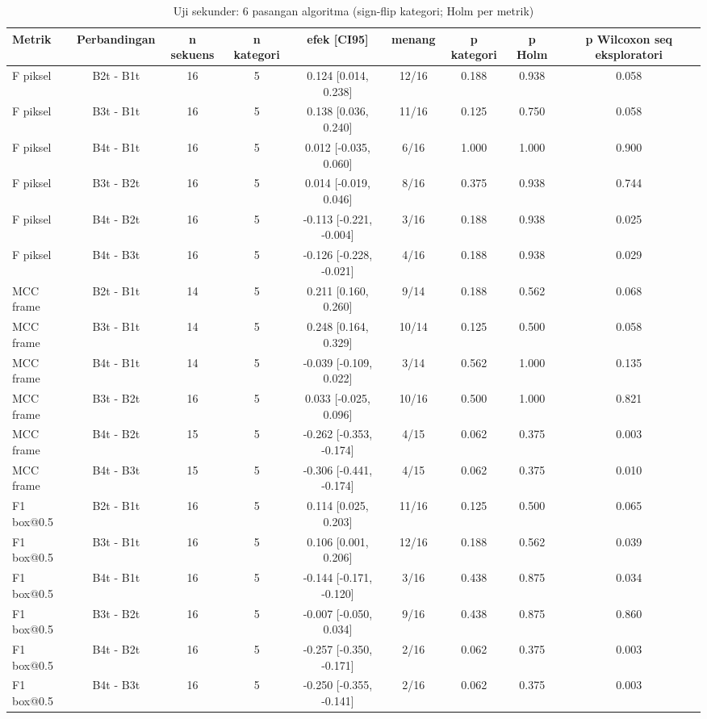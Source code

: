 \begin{table}[t]
\centering
\caption{Uji sekunder: 6 pasangan algoritma (sign-flip kategori; Holm per metrik)}
\label{tab:stats_secondary}
\begin{tabular}{lcccccccc}
\toprule
Metrik & Perbandingan & n sekuens & n kategori & efek [CI95] & menang & p kategori & p Holm & p Wilcoxon seq eksploratori \\
\midrule
F piksel & B2t - B1t & 16 & 5 & 0.124 [0.014, 0.238] & 12/16 & 0.188 & 0.938 & 0.058 \\
F piksel & B3t - B1t & 16 & 5 & 0.138 [0.036, 0.240] & 11/16 & 0.125 & 0.750 & 0.058 \\
F piksel & B4t - B1t & 16 & 5 & 0.012 [-0.035, 0.060] & 6/16 & 1.000 & 1.000 & 0.900 \\
F piksel & B3t - B2t & 16 & 5 & 0.014 [-0.019, 0.046] & 8/16 & 0.375 & 0.938 & 0.744 \\
F piksel & B4t - B2t & 16 & 5 & -0.113 [-0.221, -0.004] & 3/16 & 0.188 & 0.938 & 0.025 \\
F piksel & B4t - B3t & 16 & 5 & -0.126 [-0.228, -0.021] & 4/16 & 0.188 & 0.938 & 0.029 \\
MCC frame & B2t - B1t & 14 & 5 & 0.211 [0.160, 0.260] & 9/14 & 0.188 & 0.562 & 0.068 \\
MCC frame & B3t - B1t & 14 & 5 & 0.248 [0.164, 0.329] & 10/14 & 0.125 & 0.500 & 0.058 \\
MCC frame & B4t - B1t & 14 & 5 & -0.039 [-0.109, 0.022] & 3/14 & 0.562 & 1.000 & 0.135 \\
MCC frame & B3t - B2t & 16 & 5 & 0.033 [-0.025, 0.096] & 10/16 & 0.500 & 1.000 & 0.821 \\
MCC frame & B4t - B2t & 15 & 5 & -0.262 [-0.353, -0.174] & 4/15 & 0.062 & 0.375 & 0.003 \\
MCC frame & B4t - B3t & 15 & 5 & -0.306 [-0.441, -0.174] & 4/15 & 0.062 & 0.375 & 0.010 \\
F1 box@0.5 & B2t - B1t & 16 & 5 & 0.114 [0.025, 0.203] & 11/16 & 0.125 & 0.500 & 0.065 \\
F1 box@0.5 & B3t - B1t & 16 & 5 & 0.106 [0.001, 0.206] & 12/16 & 0.188 & 0.562 & 0.039 \\
F1 box@0.5 & B4t - B1t & 16 & 5 & -0.144 [-0.171, -0.120] & 3/16 & 0.438 & 0.875 & 0.034 \\
F1 box@0.5 & B3t - B2t & 16 & 5 & -0.007 [-0.050, 0.034] & 9/16 & 0.438 & 0.875 & 0.860 \\
F1 box@0.5 & B4t - B2t & 16 & 5 & -0.257 [-0.350, -0.171] & 2/16 & 0.062 & 0.375 & 0.003 \\
F1 box@0.5 & B4t - B3t & 16 & 5 & -0.250 [-0.355, -0.141] & 2/16 & 0.062 & 0.375 & 0.003 \\
\bottomrule
\end{tabular}
\end{table}
